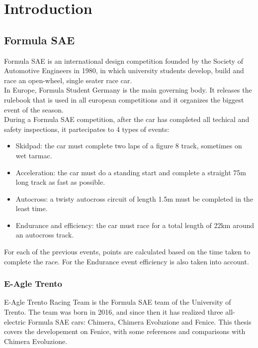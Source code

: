 \chapter{Introduction}

\section{Formula SAE}
Formula SAE is an international design competition founded by the Society of Automotive Engineers in 1980, in which university students develop, build and race an open-wheel, single seater race car.\\
In Europe, Formula Student Germany is the main governing body. It releases the rulebook \cite{fsg2020} that is used in all european competitions and it organizes the biggest event of the season.\\
During a Formula SAE competition, after the car has completed all techical and safety inspections, it partecipates to 4 types of events:
\begin{itemize}
    \item Skidpad: the car must complete two laps of a figure 8 track, sometimes on wet tarmac.
    \item Acceleration: the car must do a standing start and complete a straight 75m long track as fast as possible.
    \item Autocross: a twisty autocross circuit of length 1.5m must be completed in the least time.
    \item Endurance and efficiency: the car must race for a total length of 22km around an autocross track.
\end{itemize}
For each of the previous events, points are calculated based on the time taken to complete the race. For the Endurance event efficiency is also taken into account.
\subsection{E-Agle Trento}
E-Agle Trento Racing Team is the Formula SAE team of the University of Trento. The team was born in 2016, and since then it has realized three all-electric Formula SAE cars: Chimera, Chimera Evoluzione and Fenice. This thesis covers the developement on Fenice, with some references and comparisons with Chimera Evoluzione.


